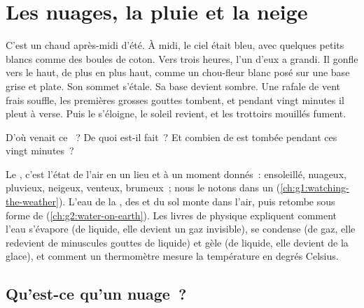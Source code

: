 \chapter{Les nuages, la pluie et la neige}\label{ch:g4:clouds-rain-snow}

C'est un chaud après-midi d'été. À midi, le ciel était bleu, avec quelques
petits  blancs comme des boules de coton. Vers trois heures, l'un
d'eux a grandi. Il gonfle vers le haut, de plus en plus haut, comme un
chou-fleur blanc posé sur une base grise et plate. Son sommet s'étale. Sa
base devient sombre. Une rafale de vent frais souffle, les premières
grosses gouttes tombent, et pendant vingt minutes il pleut à verse. Puis le
 s'éloigne, le soleil revient, et les trottoirs mouillés fument.

D'où venait ce ~? De quoi est-il fait~? Et combien de  est tombée
pendant ces vingt minutes~?

\begin{recall}
Le , c'est l'état de l'air en un lieu et à un moment
donnés~: ensoleillé, nuageux, pluvieux, neigeux, venteux, brumeux~; nous le
notons dans un  (\cref{ch:g1:watching-the-weather}). L'eau de
la , des  et du sol monte dans l'air, puis retombe sous forme de
 (\cref{ch:g2:water-on-earth}). Les livres de physique expliquent
comment l'eau s'évapore (de liquide, elle devient un gaz invisible), se
condense (de gaz, elle redevient de minuscules gouttes de liquide) et gèle
(de liquide, elle devient de la glace), et comment un thermomètre mesure la
température en degrés Celsius.
\end{recall}

\section{Qu'est-ce qu'un nuage~?}

